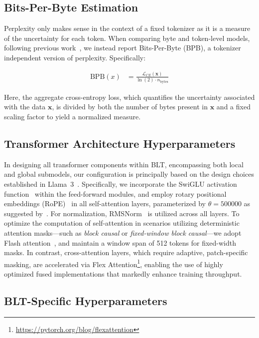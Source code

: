 \subsection{Bits-Per-Byte Estimation} Perplexity only makes sense in the context of a fixed tokenizer as it is a measure of the uncertainty for each token. When comparing byte and token-level models, following previous work~\citep{xue2022byt5, yu2023megabyte, wang2024mambabyte}, we instead report Bits-Per-Byte (BPB), a tokenizer independent version of perplexity. Specifically:

\begin{align}
    \text{BPB}(x)&= \frac{\mathcal{L}_{CE}(\pmb{x})}{\ln(2)\cdot n_{\text{bytes}}}
\end{align}

Here, the aggregate cross-entropy loss, which quantifies the uncertainty associated with the data $\pmb{x}$, is divided by both the number of bytes present in $\pmb{x}$ and a fixed scaling factor to yield a normalized measure.

\subsection{Transformer Architecture Hyperparameters} In designing all transformer components within {\textsc BLT}, encompassing both local and global submodels, our configuration is principally based on the design choices established in Llama~3~\citep{dubey2024llama}. Specifically, we incorporate the SwiGLU activation function~\citep{swiglu} within the feed-forward modules, and employ rotary positional embeddings (RoPE)~\citep{RoPe} in all self-attention layers, parameterized by $\theta=500000$ as suggested by~\citep{xiong2024effective}. For normalization, RMSNorm~\citep{RMSNorm} is utilized across all layers. To optimize the computation of self-attention in scenarios utilizing deterministic attention masks—such as \textit{block causal} or \textit{fixed-window block causal}—we adopt Flash attention~\citep{dao2022flashattention}, and maintain a window span of 512 tokens for fixed-width masks. In contrast, cross-attention layers, which require adaptive, patch-specific masking, are accelerated via Flex Attention\footnote{\url{https://pytorch.org/blog/flexattention}}, enabling the use of highly optimized fused implementations that markedly enhance training throughput.

\subsection{{\textsc BLT}-Specific Hyperparameters} 

